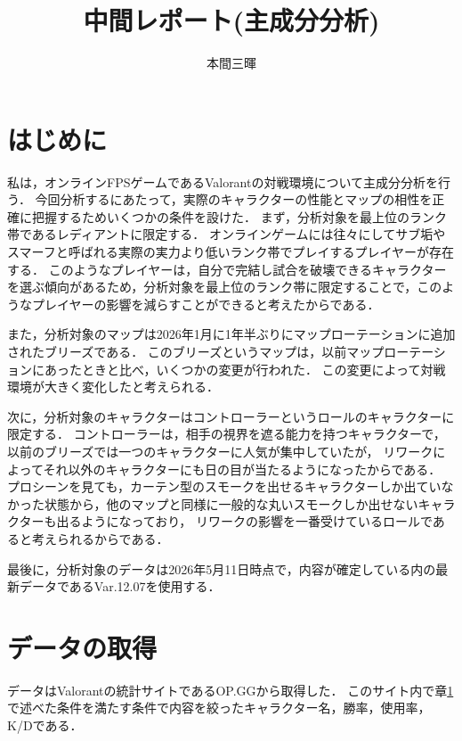 \documentclass[titlepage,a4paper]{jsarticle}
\title{中間レポート(主成分分析)}
\author{本間三暉}
\begin{document}
\maketitle
\section{はじめに}\label{first}
  私は，オンラインFPSゲームであるValorantの対戦環境について主成分分析を行う．
今回分析するにあたって，実際のキャラクターの性能とマップの相性を正確に把握するためいくつかの条件を設けた．
まず，分析対象を最上位のランク帯であるレディアントに限定する．
オンラインゲームには往々にしてサブ垢やスマーフと呼ばれる実際の実力より低いランク帯でプレイするプレイヤーが存在する．
このようなプレイヤーは，自分で完結し試合を破壊できるキャラクターを選ぶ傾向があるため，分析対象を最上位のランク帯に限定することで，このようなプレイヤーの影響を減らすことができると考えたからである．

  また，分析対象のマップは2026年1月に1年半ぶりにマップローテーションに追加されたブリーズ\cite{パッチノート}である．
このブリーズというマップは，以前マップローテーションにあったときと比べ，いくつかの変更が行われた．
この変更によって対戦環境が大きく変化したと考えられる．

  次に，分析対象のキャラクターはコントローラーというロールのキャラクターに限定する．
コントローラーは，相手の視界を遮る能力を持つキャラクターで，以前のブリーズでは一つのキャラクターに人気が集中していたが，
リワークによってそれ以外のキャラクターにも日の目が当たるようになったからである．
プロシーンを見ても，カーテン型のスモークを出せるキャラクターしか出ていなかった状態から，他のマップと同様に一般的な丸いスモークしか出せないキャラクターも出るようになっており，
リワークの影響を一番受けているロールであると考えられるからである．

最後に，分析対象のデータは2026年5月11日時点で，内容が確定している内の最新データであるVar.12.07を使用する．

\section{データの取得}
  データはValorantの統計サイトであるOP.GG\cite{opgg}から取得した．
このサイト内で章\ref{first}で述べた条件を満たす条件で内容を絞ったキャラクター名，勝率，使用率，K/Dである．
\end{document}
